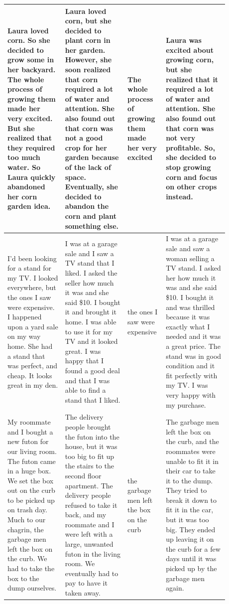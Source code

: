 \begin{table}[htp!]
\begin{tabular}{|p{0.24\linewidth}|p{0.26\linewidth}|p{0.12\linewidth}|p{0.26\linewidth}|}
Laura loved corn. So she decided to grow some in her backyard. The whole process of growing them made her very excited. But she realized that they required too much water. So Laura quickly abandoned her corn garden idea.
& Laura loved corn, but she decided to plant corn in her garden. However, she soon realized that corn required a lot of water and attention. She also found out that corn was not a good crop for her garden because of the lack of space. Eventually, she decided to abandon the corn and plant something else.
& The whole process of growing them made her very excited
& Laura was excited about growing corn, but she realized that it required a lot of water and attention. She also found out that corn was not very profitable. So, she decided to stop growing corn and focus on other crops instead. \\ \hline

I'd been looking for a stand for my TV. I looked everywhere, but the ones I saw were expensive. I happened upon a yard sale on my way home. She had a stand that was perfect, and cheap. It looks great in my den.
& I was at a garage sale and I saw a TV stand that I liked. I asked the seller how much it was and she said \$10. I bought it and brought it home. I was able to use it for my TV and it looked great. I was happy that I found a good deal and that I was able to find a stand that I liked.
& the ones I saw were expensive
& I was at a garage sale and saw a woman selling a TV stand. I asked her how much it was and she said \$10. I bought it and was thrilled because it was exactly what I needed and it was a great price. The stand was in good condition and it fit perfectly with my TV. I was very happy with my purchase. \\ \hline

My roommate and I bought a new futon for our living room. The futon came in a huge box. We set the box out on the curb to be picked up on trash day. Much to our chagrin, the garbage men left the box on the curb. We had to take the box to the dump ourselves.
& The delivery people brought the futon into the house, but it was too big to fit up the stairs to the second floor apartment. The delivery people refused to take it back, and my roommate and I were left with a large, unwanted futon in the living room. We eventually had to pay to have it taken away.
& the garbage men left the box on the curb
& The garbage men left the box on the curb, and the roommates were unable to fit it in their car to take it to the dump. They tried to break it down to fit it in the car, but it was too big. They ended up leaving it on the curb for a few days until it was picked up by the garbage men again. \\ \hline


\end{tabular}
\end{table}
